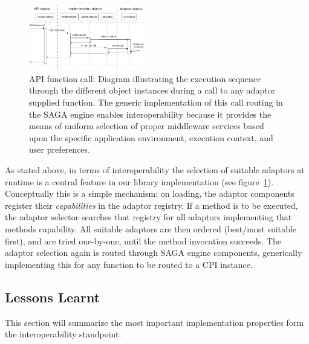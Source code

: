 \documentclass[conference,final]{IEEEtran}
\newcommand{\I}{\textit}
\newcommand{\upup}{\vspace*{-1em}}
\begin{document}
\begin{figure}[!ht]
 \begin{center}
\includegraphics[width=0.45\textwidth]{../diagrams/object_lifetime_functioncall}
\caption{\label{fig:object_functioncall} API function call: Diagram
  illustrating the execution sequence through the different object
  instances during a call to any adaptor supplied function. The generic
  implementation of this call routing in the SAGA engine enables 
  interoperability because it provides the means of uniform selection of proper 
  middleware services based upon the specific application environment, 
  execution context, and user preferences.\upup}
\end{center}
\end{figure}




As stated above, in terms of interoperability the selection of
suitable adaptors at runtime is a central feature in our library
implementation (see figure~\ref{fig:object_functioncall}).  Conceptually 
this is a  simple mechanism: on loading, the adaptor components
register their \I{capabilities} in the adaptor registry.  If a method
is to be executed, the adaptor selector searches that registry for all
adaptors implementing that methods capability.  All suitable adaptors
are then ordered (best/most suitable first), and are tried one-by-one,
until the method invocation succeeds. The adaptor selection again is
routed through SAGA engine components, generically implementing this
for any function to be routed to a CPI instance.

\subsection{Lessons Learnt}
\label{ssec:learntlessons}

This section will summarize the most important implementation properties
form the interoperability standpoint: 
\end{document}
